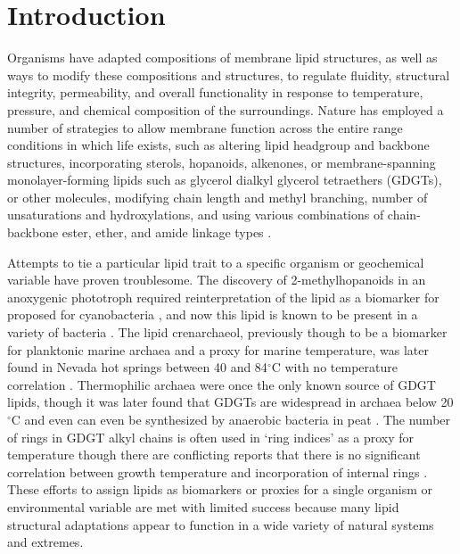 \section{Introduction}
Organisms have adapted compositions of membrane lipid structures, as well as ways to modify these compositions and structures, to regulate fluidity, structural integrity, permeability, and overall functionality in response to temperature, pressure, and chemical composition of the surroundings. Nature has employed a number of strategies to allow membrane function across the entire range conditions in which life exists, such as altering lipid headgroup and backbone structures, incorporating sterols, hopanoids, alkenones, or membrane-spanning monolayer-forming lipids such as glycerol dialkyl glycerol tetraethers (GDGTs), or other molecules, modifying chain length and methyl branching, number of unsaturations and hydroxylations, and using various combinations of chain-backbone ester, ether, and amide linkage types \citep{marlowe1984long, belin2018hopanoid, van2008membrane}.

Attempts to tie a particular lipid trait to a specific organism or geochemical variable have proven troublesome. The discovery of 2-methylhopanoids in an anoxygenic phototroph \citep{rashby2007biosynthesis} required reinterpretation of the lipid as a biomarker for proposed for cyanobacteria \citep{summons1992methylhopanoids}, and now this lipid is known to be present in a variety of bacteria \citep{ricci2014diverse}. The lipid crenarchaeol, previously though to be a biomarker for planktonic marine archaea and a proxy for marine temperature, was later found in Nevada hot springs between 40 and 84$^{\circ}$C with no temperature correlation \citep{pearson2004nonmarine}. Thermophilic archaea were once the only known source of GDGT lipids, though it was later found that GDGTs are widespread in archaea below 20$^{\circ}$C \cite{schouten2000widespread} and even can even be synthesized by anaerobic bacteria in peat \citep{weijers2006membrane}. The number of rings in GDGT alkyl chains is often used in `ring indices' as a proxy for temperature \citep{schouten2002distributional, tierney2012gdgt} though there are conflicting reports that there is no significant correlation between growth temperature and incorporation of internal rings \citep{sollich2017heat}. These efforts to assign lipids as biomarkers or proxies for a single organism or environmental variable are met with limited success because many lipid structural adaptations appear to function in a wide variety of natural systems and extremes.


